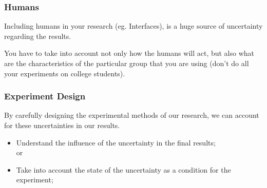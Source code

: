 \documentclass{beamer}
\begin{document}
\begin{frame}
  \frametitle{Humans}
  \begin{block}{}
    Including humans in your research (eg. Interfaces), is a huge
    source of uncertainty regarding the results.
    \medskip
    
    You have to take into account not only how the humans will act,
    but also what are the characteristics of the particular group that
    you are using (don't do all your experiments on college students).
  \end{block}
\end{frame}

\begin{frame}
  \frametitle{Experiment Design} 

  By carefully designing the experimental methods of our research, we
  can account for these uncertainties in our results. 
  \bigskip
  \begin{itemize}
  \item Understand the influence of the uncertainty in the final results;\\
    or
  \item Take into account the state of the uncertainty as a condition
    for the experiment;
  \end{itemize}
\end{frame}
\end{document}
